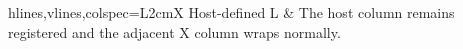 \documentclass{article}
\begin{document}
\begin{tblr}{hlines,vlines,colspec={L{2cm}X}}
Host-defined L &
The host column remains registered and the adjacent X column wraps normally.
\end{tblr}
\end{document}
